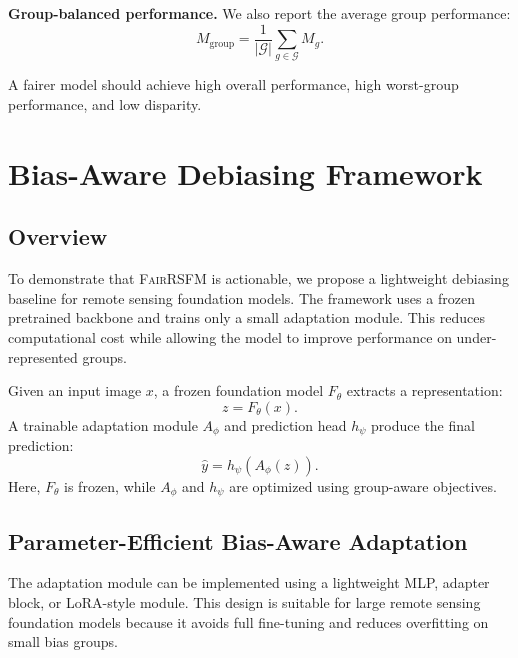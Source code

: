 \documentclass[10pt,twocolumn,letterpaper]{article}
\newcommand{\method}{\textsc{FairRSFM}\xspace}
\begin{document}
\textbf{Group-balanced performance.}
We also report the average group performance:
\begin{equation}
M_{\text{group}} = \frac{1}{|\mathcal{G}|} \sum_{g \in \mathcal{G}} M_g.
\end{equation}

A fairer model should achieve high overall performance, high worst-group performance, and low disparity.

\section{Bias-Aware Debiasing Framework}

\subsection{Overview}

To demonstrate that \method is actionable, we propose a lightweight debiasing baseline for remote sensing foundation models. The framework uses a frozen pretrained backbone and trains only a small adaptation module. This reduces computational cost while allowing the model to improve performance on under-represented groups.

Given an input image $x$, a frozen foundation model $F_{\theta}$ extracts a representation:
\begin{equation}
z = F_{\theta}(x).
\end{equation}
A trainable adaptation module $A_{\phi}$ and prediction head $h_{\psi}$ produce the final prediction:
\begin{equation}
\hat{y} = h_{\psi}(A_{\phi}(z)).
\end{equation}
Here, $F_{\theta}$ is frozen, while $A_{\phi}$ and $h_{\psi}$ are optimized using group-aware objectives.

\subsection{Parameter-Efficient Bias-Aware Adaptation}

The adaptation module can be implemented using a lightweight MLP, adapter block, or LoRA-style module. This design is suitable for large remote sensing foundation models because it avoids full fine-tuning and reduces overfitting on small bias groups.
\end{document}
